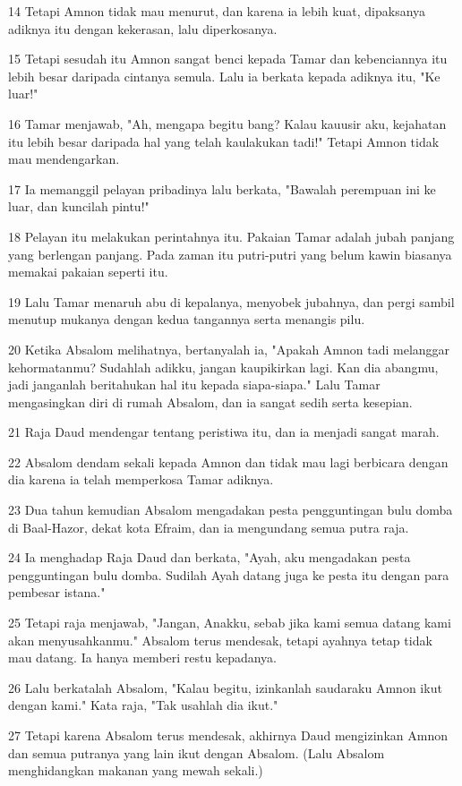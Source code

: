 \par 14 Tetapi Amnon tidak mau menurut, dan karena ia lebih kuat, dipaksanya adiknya itu dengan kekerasan, lalu diperkosanya.
\par 15 Tetapi sesudah itu Amnon sangat benci kepada Tamar dan kebenciannya itu lebih besar daripada cintanya semula. Lalu ia berkata kepada adiknya itu, "Ke luar!"
\par 16 Tamar menjawab, "Ah, mengapa begitu bang? Kalau kauusir aku, kejahatan itu lebih besar daripada hal yang telah kaulakukan tadi!" Tetapi Amnon tidak mau mendengarkan.
\par 17 Ia memanggil pelayan pribadinya lalu berkata, "Bawalah perempuan ini ke luar, dan kuncilah pintu!"
\par 18 Pelayan itu melakukan perintahnya itu. Pakaian Tamar adalah jubah panjang yang berlengan panjang. Pada zaman itu putri-putri yang belum kawin biasanya memakai pakaian seperti itu.
\par 19 Lalu Tamar menaruh abu di kepalanya, menyobek jubahnya, dan pergi sambil menutup mukanya dengan kedua tangannya serta menangis pilu.
\par 20 Ketika Absalom melihatnya, bertanyalah ia, "Apakah Amnon tadi melanggar kehormatanmu? Sudahlah adikku, jangan kaupikirkan lagi. Kan dia abangmu, jadi janganlah beritahukan hal itu kepada siapa-siapa." Lalu Tamar mengasingkan diri di rumah Absalom, dan ia sangat sedih serta kesepian.
\par 21 Raja Daud mendengar tentang peristiwa itu, dan ia menjadi sangat marah.
\par 22 Absalom dendam sekali kepada Amnon dan tidak mau lagi berbicara dengan dia karena ia telah memperkosa Tamar adiknya.
\par 23 Dua tahun kemudian Absalom mengadakan pesta pengguntingan bulu domba di Baal-Hazor, dekat kota Efraim, dan ia mengundang semua putra raja.
\par 24 Ia menghadap Raja Daud dan berkata, "Ayah, aku mengadakan pesta pengguntingan bulu domba. Sudilah Ayah datang juga ke pesta itu dengan para pembesar istana."
\par 25 Tetapi raja menjawab, "Jangan, Anakku, sebab jika kami semua datang kami akan menyusahkanmu." Absalom terus mendesak, tetapi ayahnya tetap tidak mau datang. Ia hanya memberi restu kepadanya.
\par 26 Lalu berkatalah Absalom, "Kalau begitu, izinkanlah saudaraku Amnon ikut dengan kami." Kata raja, "Tak usahlah dia ikut."
\par 27 Tetapi karena Absalom terus mendesak, akhirnya Daud mengizinkan Amnon dan semua putranya yang lain ikut dengan Absalom. (Lalu Absalom menghidangkan makanan yang mewah sekali.)
